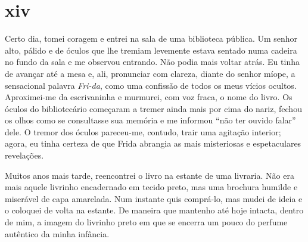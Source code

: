 \section{xiv} 

 

Certo dia, tomei coragem e entrei na sala de uma biblioteca pública. Um senhor
alto, pálido e de óculos que lhe tremiam levemente estava sentado numa
cadeira no fundo da sala e me observou entrando. Não podia mais voltar atrás.
Eu tinha de avançar até a mesa e, ali, pronunciar com clareza, diante do
senhor míope, a sensacional palavra \textit{Fri-da}, como uma confissão de
todos os meus vícios ocultos. Aproximei-me da escrivaninha e murmurei, com
voz fraca, o nome do livro. Os óculos do bibliotecário começaram a tremer
ainda mais por cima do nariz, fechou os olhos como se consultasse sua memória
e me informou ``não ter ouvido falar'' dele. O tremor dos óculos pareceu-me,
contudo, trair uma agitação interior; agora, eu tinha certeza de que Frida
abrangia as mais misteriosas e espetaculares revelações.

Muitos anos mais tarde, reencontrei o livro na estante de uma livraria. Não
era mais aquele livrinho encadernado em tecido preto, mas uma brochura
humilde e miserável de capa amarelada. Num instante quis comprá-lo, mas mudei
de ideia e o coloquei de volta na estante. De maneira que mantenho até hoje
intacta, dentro de mim, a imagem do livrinho preto em que se encerra um pouco
do perfume autêntico da minha infância.


